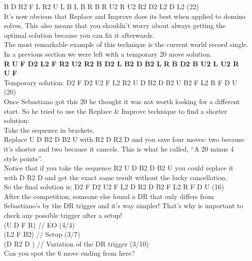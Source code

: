 \documentclass[11pt,a4paper]{book}
\newcommand{\p}{\textquotesingle}
\newcommand{\ps}{\p\,\,}
\newcommand{\comment}[1]{{\color{gray}\quad//#1}}
\begin{document}
B\ps D\ps R2 F\ps L\ps R2 U L\ps B L B\ps R B R\ps U2 R\ps U2 R2 D2 L2 D\ps L2 (22)\\
\newline
It’s now obvious that Replace and Improve does its best when applied to domino solves. 
This also means that you shouldn’t worry about always getting the optimal solution because you can fix it afterwards. \\
\newline
The most remarkable example of this technique is the current world record single. In a previous section we were left with a temporary 20 move solution.\\
\newline
\textbf{R\ps U\ps F D2 L2 F R2 U2 R2 B D2 L B2 D\ps B2 L\ps R\ps B D2 B U2 L U2 R\ps U\ps F}\\
\newline
Temporary solution: D2 F\ps D2 U2 F\ps L2 R2 {U\ps D B2 D B2 U} B2 F L2 R\ps F\ps D U\ps (20)\\
\newline
Once Sebastiano got this 20 he thought it was not worth looking for a different start. So he tried to use the Replace \& Improve technique to find a shorter solution:\\
\newline
Take the sequence in brackets.\\
Replace U\ps D B2 D B2 U with R2 D R2 D and you save four moves: two because it's shorter and two because it cancels. This is what he called, “A 20 minus 4 style points”.\\
Notice that if you take the sequence {R2 U\ps D B2 D B2 U} you could replace it with D R2 D and get the exact same result without the lucky cancellation.\\
\newline
So the final solution is: D2 F\ps D2 U2 F\ps L2 D R2 D B2 F L2 R\ps F\ps D U\ps (16)\\
\newline
After the competition, someone else found a DR that only differs from Sebastiano's by the DR trigger and it's way simpler! That's why is important to check any possible trigger after a setup!\\
\newline
(U D\ps F R) \comment{ EO (4/4)}\\
(L2 F\ps B2) \comment{ Setup (3/7)}\\
(D\ps R2 D\ps) \comment{ Variation of the DR trigger (3/10)}\\
Can you spot the 6 move ending from here?\\
\end{document}
